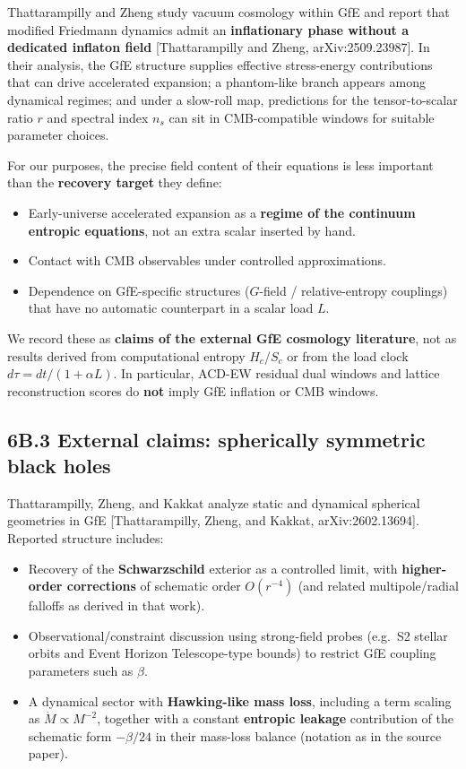 \documentclass[
  11pt,
]{article}
\providecommand{\tightlist}{%
  \setlength{\itemsep}{0pt}\setlength{\parskip}{0pt}}
\begin{document}
Thattarampilly and Zheng study vacuum cosmology within GfE and report that modified Friedmann dynamics admit an \textbf{inflationary phase without a dedicated inflaton field} {[}Thattarampilly and Zheng, arXiv:2509.23987{]}. In their analysis, the GfE structure supplies effective stress-energy contributions that can drive accelerated expansion; a phantom-like branch appears among dynamical regimes; and under a slow-roll map, predictions for the tensor-to-scalar ratio \(r\) and spectral index \(n_s\) can sit in CMB-compatible windows for suitable parameter choices.

For our purposes, the precise field content of their equations is less important than the \textbf{recovery target} they define:

\begin{itemize}
\tightlist
\item
  Early-universe accelerated expansion as a \textbf{regime of the continuum entropic equations}, not an extra scalar inserted by hand.
\item
  Contact with CMB observables under controlled approximations.
\item
  Dependence on GfE-specific structures (\(G\)-field / relative-entropy couplings) that have no automatic counterpart in a scalar load \(L\).
\end{itemize}

We record these as \textbf{claims of the external GfE cosmology literature}, not as results derived from computational entropy \(H_c\)/\(S_c\) or from the load clock \(d\tau=dt/(1+\alpha L)\). In particular, ACD-EW residual dual windows and lattice reconstruction scores do \textbf{not} imply GfE inflation or CMB windows.

\subsection{6B.3 External claims: spherically symmetric black holes}\label{b.3-external-claims-spherically-symmetric-black-holes}

Thattarampilly, Zheng, and Kakkat analyze static and dynamical spherical geometries in GfE {[}Thattarampilly, Zheng, and Kakkat, arXiv:2602.13694{]}. Reported structure includes:

\begin{itemize}
\tightlist
\item
  Recovery of the \textbf{Schwarzschild} exterior as a controlled limit, with \textbf{higher-order corrections} of schematic order \(O(r^{-4})\) (and related multipole/radial falloffs as derived in that work).
\item
  Observational/constraint discussion using strong-field probes (e.g.~S2 stellar orbits and Event Horizon Telescope-type bounds) to restrict GfE coupling parameters such as \(\beta\).
\item
  A dynamical sector with \textbf{Hawking-like mass loss}, including a term scaling as \(\dot M\propto M^{-2}\), together with a constant \textbf{entropic leakage} contribution of the schematic form \(-\beta/24\) in their mass-loss balance (notation as in the source paper).
\end{itemize}
\end{document}
